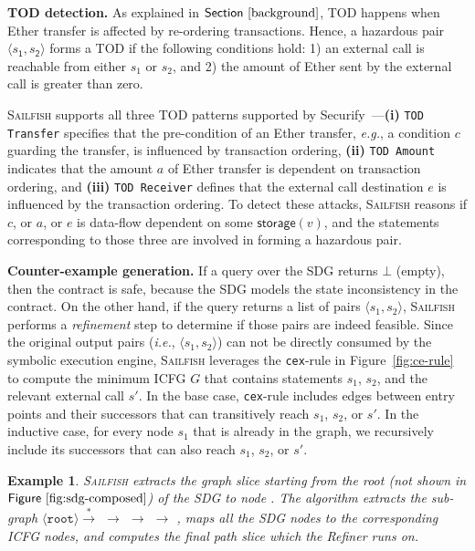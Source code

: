 \documentclass[conference, romanappendices]{tex/IEEEtran}
\theoremstyle{bfnote}
\newcommand{\toolname}{\textsc{Sailfish}\xspace}
\newcommand{\refiner}{{\sc Refiner}\xspace}
\newcommand{\securify}{{\sc Securify}\xspace}
\newcommand{\ether}{{Ether}\xspace}
\newcommand{\eg}{\textit{e.g.}}
\newcommand{\ie}{\textit{i.e.}}
\newcommand{\Fig}[1]{\ensuremath{\sf Figure~\ref{#1}}}
\newcommand{\Sect}[1]{\ensuremath{\sf Section~\ref{#1}}}
\newcommand*\circledtext[1]{\tikz[baseline=(char.base)]{\node[shape=circle,fill,inner sep=1pt] (char) {\textcolor{white}{\small{#1}}};}}
\newtheorem{example}{Example}
\begin{document}
\vspace{-2mm}
\noindent
\textbf{TOD detection.}
As explained in \Sect{background}, TOD happens when \ether transfer is affected by re-ordering transactions.
Hence, a hazardous pair $\langle s_{\mathsf{1}}, s_{\mathsf{2}} \rangle$ forms a TOD if the following conditions hold: 1) an external call is reachable from either $s_1$ or $s_2$, and 2) the amount of \ether sent by the external call is greater than zero.

\toolname supports all three TOD patterns supported by \securify~\cite{securify}---\textbf{(i)} \texttt{TOD Transfer} specifies that the pre-condition of an \ether transfer, \eg, a condition $c$ guarding the transfer, is influenced by transaction ordering,
\textbf{(ii)} \texttt{TOD Amount} indicates that the amount $a$ of \ether transfer is dependent on transaction ordering, and
\textbf{(iii)} \texttt{TOD Receiver} defines that the external call destination $e$ is influenced by the transaction ordering.
To detect these attacks, \toolname reasons if $c$, or $a$, or $e$ is data-flow dependent on some $\mathsf{storage}(v)$, and the statements corresponding to those three are involved in forming a hazardous pair.

\noindent
\textbf{Counter-example generation.}
If a query over the SDG returns $\bot$ (empty), then the contract is safe, because the SDG models the state inconsistency in the contract. 
On the other hand, if the query returns a list of pairs $\langle s_1, s_2 \rangle$, \toolname performs a \emph{refinement} step to determine if those pairs are indeed feasible.
Since the original output pairs (\ie, $\langle s_1, s_2 \rangle$) can not be directly consumed by the symbolic execution engine, \toolname leverages the \texttt{cex}-rule in Figure~\ref{fig:ce-rule} to compute the minimum ICFG $G$ that contains statements $s_1$, $s_2$, and the relevant external call $s'$. 
In the base case, \texttt{cex}-rule includes edges between entry points and their successors that can transitively reach $s_1$, $s_2$, or $s'$. In the inductive case, for every node $s_1$ that is already in the graph, we recursively include its successors that can also reach $s_1$, $s_2$, or $s'$.

\vspace{-2mm}
\begin{example}
\toolname{} extracts the graph slice starting from the root (not shown in \Fig{fig:sdg-composed}) of the SDG to node \circledtext{5}.
The algorithm extracts the sub-graph $\langle \texttt{root} \rangle \!\!\xrightarrow{*}$ \circledtext{2} $\rightarrow$ \circledtext{4} $\rightarrow$ \circledtext{5} $\rightarrow$ \circledtext{3}, maps all the SDG nodes to the corresponding ICFG nodes, and computes the final path slice which the \refiner{} runs on.
\end{example}
\end{document}
